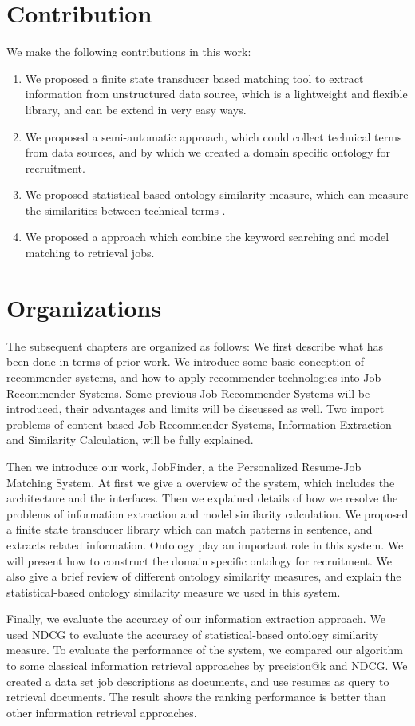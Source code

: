\section{Contribution}

We make the following contributions in this work:

\begin{enumerate}
    \item  We proposed a finite state transducer based matching tool to extract information from unstructured data source, which is a lightweight and flexible library, and can be extend in very easy ways.
    \item  We proposed a semi-automatic approach, which could collect technical terms from data sources, and by which we created a domain specific ontology for recruitment.
    \item  We proposed statistical-based ontology similarity measure, which can measure the similarities between technical terms .
    \item  We proposed a approach which combine the keyword searching and model matching to retrieval jobs.
\end{enumerate}

\section{Organizations}
The subsequent chapters are organized as follows: We first describe what has been done in terms of prior work.  We introduce some basic conception of recommender systems, and how to apply recommender technologies into Job Recommender Systems. Some previous Job Recommender Systems will be introduced,  their advantages and limits will be discussed as well.  Two import problems of content-based Job Recommender Systems, Information Extraction and Similarity Calculation, will be fully explained.

Then we introduce our work, JobFinder, a the Personalized Resume-Job Matching System. At first we give a overview of the system, which includes the architecture and the interfaces. Then we explained details of how we resolve the problems of information extraction and model similarity calculation. We proposed a finite state transducer library which can match patterns in sentence, and extracts related information. Ontology play an important role in this system. We will present how to construct the domain specific ontology for recruitment. We also give a brief review of different ontology similarity measures, and explain the statistical-based ontology similarity measure we used in this system.

Finally, we evaluate the accuracy of our information extraction approach. We used NDCG to evaluate the accuracy of statistical-based ontology similarity measure. To evaluate the performance of the system, we compared our algorithm to some classical information retrieval approaches by precision@k and NDCG. We created a data set job descriptions as documents, and use resumes as query to retrieval documents. The result shows the ranking performance is better than other information retrieval approaches.
